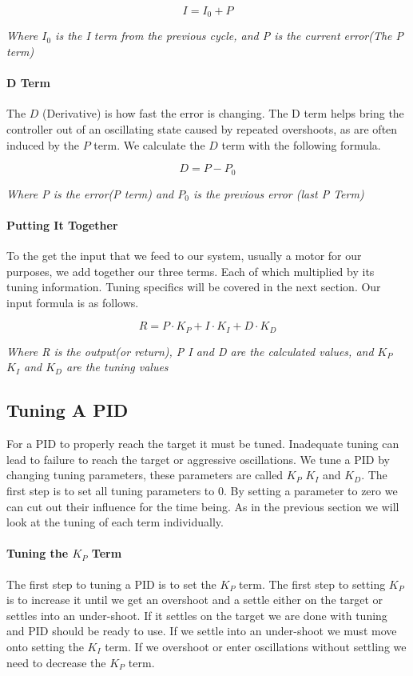 \documentclass[12pt]{report}
\begin{document}
    $$ I = I_0 + P$$
    \begin{center}\em{Where $I_0$ is the I term from the previous cycle, and P is the current error(The P term)}\end{center}

\paragraph{D Term}
    The $D$ (Derivative) is how fast the error is changing.
    The D term helps bring the controller out of an oscillating state caused by repeated overshoots, 
        as are often induced by the $P$ term. We calculate the $D$ term with the following formula.

    $$D = P - P_0$$
    \begin{center}\em{Where P is the error(P term) and $P_0$ is the previous error (last P Term)}\end{center}

\paragraph{Putting It Together}
    To the get the input that we feed to our system,
        usually a motor for our purposes, we add together our three terms.
    Each of which multiplied by its tuning information.
    Tuning specifics will be covered in the next section. 
    Our input formula is as follows.

    $$ R = P \cdot K_P + I \cdot K_I + D \cdot K_D$$
    \begin{center}
        \em{Where R is the output(or return), 
            P I and D are the calculated values, 
            and $K_P$ $K_I$ and $K_D$ are the tuning values
        }
    \end{center}

\subsection{Tuning A PID}
    For a PID to properly reach the target it must be tuned.
    Inadequate tuning can lead to failure to reach the target or aggressive oscillations.
    We tune a PID by changing tuning parameters, these parameters are called $K_P$ $K_I$ and $K_D$. 
    The first step is to set all tuning parameters to 0.
    By setting a parameter to zero we can cut out their influence for the time being. 
    As in the previous section we will look at the tuning of each term individually.

\paragraph{Tuning the $K_P$ Term}
    The first step to tuning a PID is to set the $K_P$ term.
    The first step to setting $K_P$ is to increase it until we get an overshoot and a settle either on the target or settles into an under-shoot. 
    If it settles on the target we are done with tuning and PID should be ready to use.
    If we settle into an under-shoot we must move onto setting the $K_I$ term.
    If we overshoot or enter oscillations without settling we need to decrease the $K_P$ term.
\end{document}

